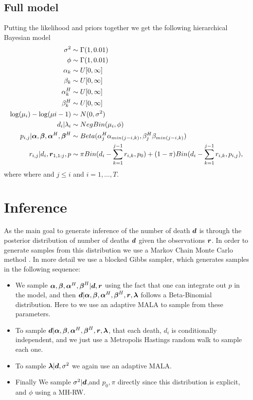 \subsection{Full model}
Putting the likelihood and priors together we get the following hierarchical Bayesian model
\begin{align*}
\sigma^2 &\sim \Gamma(1,0.01) \\
\phi &\sim \Gamma(1,0.01) \\
\alpha_k &\sim U[0,\infty] \\
\beta_k &\sim U[0,\infty] \\
\alpha_k^H &\sim U[0,\infty] \\
\beta_k^H &\sim U[0,\infty] \\
\log(\mu_i) - \log(\mu{i-1}) &\sim N(0,\sigma^2)\\
d_i| \lambda_i  &\sim NegBin(\mu_i,\phi) \\
p_{i,j}|  {\boldsymbol{\alpha}},{\boldsymbol{\beta}}, {\boldsymbol{\alpha}}^H,{\boldsymbol{\beta}}^H &\sim Beta(\alpha^H_j\alpha_{min(j-i,k)},\beta^H_j\beta_{min(j-i,k)}) \\
r_{i,j}|d_i,{\boldsymbol{r}}_{1,1:j},p &\sim \pi Bin(d_i - \sum_{k=1}^{j-1}r_{i,k},p_0)+ (1-\pi) Bin(d_i - \sum_{k=1}^{j-1}r_{i,k}, p_{i,j}),
\end{align*}
where where and $j\leq i$ and $i=1,\ldots,T$.

\section{Inference}
As the main goal to generate inference of the number of death ${\boldsymbol{d}}$ is through the posterior distribution of number of deaths ${\boldsymbol{d}}$ given the observations ${\boldsymbol{r}}$.
In order to generate samples from this distribution we use a Markov Chain Monte Carlo method \citep{Brooks2011_handbook_markov}. In more detail we use a blocked Gibbs sampler, which generates samples in the following sequence:
\begin{itemize}
	\item  We sample ${\boldsymbol{\alpha}},{\boldsymbol{\beta}}, {\boldsymbol{\alpha}}^H,{\boldsymbol{\beta}}^H|{\boldsymbol{d}}, {\boldsymbol{r}}$ using the fact that one can integrate out $p$ in the model, and then  ${\boldsymbol{d}}|{\boldsymbol{\alpha}},{\boldsymbol{\beta}}, {\boldsymbol{\alpha}}^H,{\boldsymbol{\beta}}^H,{\boldsymbol{r}},{\boldsymbol{\lambda}}$  follows a Beta-Binomial distribution. Here to we use an adaptive MALA \citep{Atchade2006_adaptive_version} to sample from these parameters.
	\item  To sample ${\boldsymbol{d}}|{\boldsymbol{\alpha}},{\boldsymbol{\beta}}, {\boldsymbol{\alpha}}^H,{\boldsymbol{\beta}}^H,{\boldsymbol{r}},{\boldsymbol{\lambda}}$, that each death, $d_i$ is conditionally independent, and we just use a Metropolis Hastings random walk to sample each one.
	\item To sample ${\boldsymbol{\lambda}} | {\boldsymbol{d}},\sigma^2$ we again use an adaptive MALA.
	\item Finally We sample $\sigma^2|{\boldsymbol{d}}$,and  $p_0,\pi$ directly since this distribution is explicit, and $\phi$ using a MH-RW.
\end{itemize}

